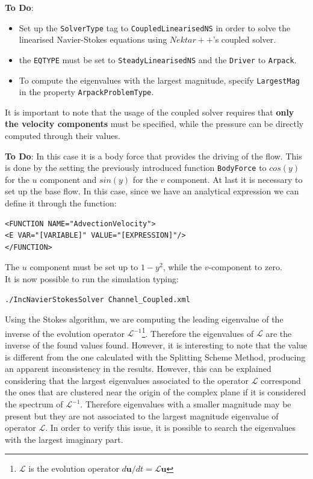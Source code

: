 \documentclass[a4paper,12pt]{article}
\begin{document}
\vspace{0.5cm}

\textbf{To Do}: 
\begin{itemize}
\item Set up the \texttt{SolverType} tag to \texttt{CoupledLinearisedNS} in order to solve the linearised Navier-Stokes equations using $Nektar++$'s coupled solver.  
\item the \texttt{EQTYPE} must be set to \texttt{SteadyLinearisedNS} and the \texttt{Driver} to \texttt{Arpack}. 
\item To compute the eigenvalues with the largest magnitude, specify \texttt{LargestMag} in the property \texttt{ArpackProblemType}.
\end{itemize}

It is important to note that the usage of the coupled solver requires that \textbf{only the velocity components} must be specified, while the pressure can be directly computed through their values. 

\vspace{0.5cm}

\textbf{To Do}: In this case it is a body force that provides the driving of the flow. This is done by the setting the  previously introduced function \texttt{BodyForce}  to $cos(y)$ for the $u$ component and $sin(y)$ for the $v$ component.  At last it is necessary to set up the  base flow. In this case, since we have an analytical expression we can define it through the function:

\begin{verbatim}
<FUNCTION NAME="AdvectionVelocity">
<E VAR="[VARIABLE]" VALUE="[EXPRESSION]"/>
</FUNCTION>
\end{verbatim}

The $u$ component must be set up to $1-y^2$, while the $v$-component to zero.\\
It is now possible to run the simulation typing:

\begin{verbatim}
./IncNavierStokesSolver Channel_Coupled.xml
\end{verbatim}

Using the Stokes algorithm, we are computing the leading eigenvalue of the inverse of the evolution operator  $\mathcal{L}^{-1}$\footnote{$\mathcal{L}$ is the evolution operator $d \mathbf{u}/dt=\mathcal{L} \mathbf{u}$}. Therefore the eigenvalues of  $\mathcal{L}$ are the inverse of the found values found. However, it is interesting to note that the value is different from the one calculated with the Splitting Scheme Method, producing an apparent inconsistency in the results. However, this can be explained considering that the largest eigenvalues associated to the operator $\mathcal{L}$ correspond the ones that are clustered near the origin of the complex plane if it is considered the spectrum of $\mathcal{L}^{-1}$. Therefore eigenvalues with a smaller magnitude may be present but they are not associated to the largest magnitude eigenvalue of operator $\mathcal{L}$. In order to verify this issue, it is possible to search the eigenvalues with the largest imaginary part.
\end{document}
